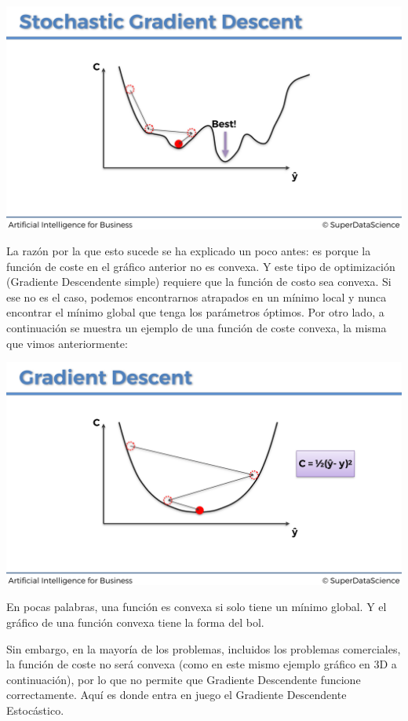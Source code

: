 \documentclass[
]{book}
\begin{document}
\includegraphics{Images/ANN_30.png}

La razón por la que esto sucede se ha explicado un poco antes: es porque la función de coste en el gráfico anterior no es convexa. Y este tipo de optimización (Gradiente Descendente simple) requiere que la función de costo sea convexa. Si ese no es el caso, podemos encontrarnos atrapados en un mínimo local y nunca encontrar el mínimo global que tenga los parámetros óptimos. Por otro lado, a continuación se muestra un ejemplo de una función de coste convexa, la misma que vimos anteriormente:

\includegraphics{Images/ANN_23.png}

En pocas palabras, una función es convexa si solo tiene un mínimo global. Y el gráfico de una función convexa tiene la forma del bol.

Sin embargo, en la mayoría de los problemas, incluidos los problemas comerciales, la función de coste no será convexa (como en este mismo ejemplo gráfico en 3D a continuación), por lo que no permite que Gradiente Descendente funcione correctamente. Aquí es donde entra en juego el Gradiente Descendente Estocástico.
\end{document}
